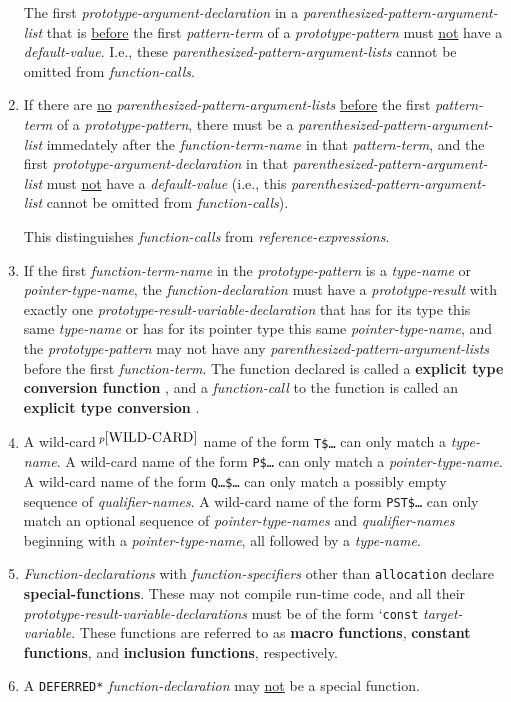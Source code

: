 \documentclass[12pt]{article}
\newcommand{\key}[1]{{\rm \bfseries #1}}
\newcommand{\skey}[2]{{\rm \bfseries #1#2}}
\newcommand{\pagnote}[1]{$\,^{p\pageref{#1}}$}
\begin{document}
\begin{enumerate}
The first {\em prototype-argument-declaration}
in a {\em parenthesized-pattern-argument-list} that is
\underline{before} the first {\em pattern-term} of a
{\em prototype-pattern} must \underline{not} have a {\em default-value}.
I.e., these {\em parenthesized-pattern-argument-lists} cannot be omitted from
{\em function-calls}.
\item
If there are \underline{no} {\em parenthesized-pattern-argument-lists}
\underline{before} the first {\em pattern-term} of a
{\em prototype-pattern}, there must be a
{\em parenthesized-pattern-argument-list}
immedately after the {\em function-term-name} in that {\em pattern-term},
and the first {\em prototype-argument-declaration} in that
{\em parenthesized-pattern-argument-list}
must \underline{not} have a {\em default-value}
(i.e., this {\em parenthesized-pattern-argument-list} cannot be omitted from
{\em function-calls}).

This distinguishes {\em function-calls} from {\em reference-expressions}.
\item
If the first {\em function-term-name} in the {\em prototype-pattern}
is a {\em type-name} or {\em pointer-type-name},
the {\em function-declaration} must have
a {\em prototype-result} with exactly
one {\em prototype-result-variable-declaration}
that has for its type this same {\em type-name} or has for its pointer type
this same {\em pointer-type-name},
and the {\em prototype-pattern} may not have any
{\em parenthesized-pattern-argument-lists} before the first
{\em function-term}.  The function
declared is called a \key{explicit type conversion function}%
\label{EXPLICIT-TYPE-CONVERSION-FUNCTION}, and a {\em function-call}
to the function is called an \key{explicit type conversion}%
\label{EXPLICIT-TYPE-CONVERSION}.
\item
A wild-card\pagnote{WILD-CARD} name of the form {\tt T\$\ldots}
can only match a {\em type-name}.
A wild-card name of the form {\tt P\$\ldots} can only match a
{\em pointer-type-name}.
A wild-card name of the form {\tt Q\ldots\$\ldots} can only match a
possibly empty sequence of {\em qualifier-names}.
A wild-card name of the form {\tt PST\$\ldots} can only match an
optional sequence of {\em pointer-type-names} and {\em qualifier-names}
beginning with a {\em pointer-type-name}, all followed by a {\em type-name}.
\item
{\em Function-declarations} with {\em function-specifiers} other
than {\tt allocation} declare
\skey{special-function}s.  These may not compile run-time code,
and all their {\em prototype-result-variable-declarations}
must be of the form `{\tt const} {\em target-variable}.
These functions are referred to as \skey{macro function}s,
\skey{constant function}s, and \skey{inclusion function}s, respectively.
\item
A {\tt *DEFERRED*} {\em function-declaration} may \underline{not} be
a special function.

\end{enumerate}
\end{document}
